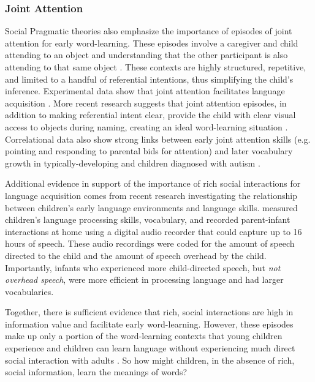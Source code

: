 \documentclass[man]{apa2}
\begin{document}
\subsubsection{Joint Attention}

Social Pragmatic theories also emphasize the importance of episodes of joint attention for early word-learning. These episodes involve a caregiver and child attending to an object and understanding that the other participant is also attending to that same object \cite{carpenter1995joint, tomasello1983joint}. These contexts are highly structured, repetitive, and limited to a handful of referential intentions, thus simplifying the child's inference. Experimental data show that joint attention facilitates language acquisition \cite{brooks2008infant,farrar1993event}. More recent research suggests that joint attention episodes, in addition to making referential intent clear, provide the child with clear visual access to objects during naming, creating an ideal word-learning situation \cite{yu2012embodied}. Correlational data also show strong links between early joint attention skills (e.g. pointing and responding to parental bids for attention) and later vocabulary growth in typically-developing \cite{tomasello1986joint, carpenter1998social,farrant2012early} and children diagnosed with autism \cite{mundy1990longitudinal}.

Additional evidence in support of the importance of rich social interactions for language acquisition comes from recent research investigating the relationship between children's early language environments and language skills.  measured children's language processing skills, vocabulary, and recorded parent-infant interactions at home using a digital audio recorder that could capture up to 16 hours of speech. These audio recordings were coded for the amount of speech directed to the child and the amount of speech overhead by the child. Importantly, infants who experienced more child-directed speech, but \emph{not overhead speech}, were more efficient in processing language and had larger vocabularies. 

Together, there is sufficient evidence that rich, social interactions are high in information value and facilitate early word-learning. However, these episodes make up only a portion of the word-learning contexts that young children experience \cite{frank2013social} and children can learn language without experiencing much direct social interaction with adults \cite{shneidman2012language}. So how might children, in the absence of rich, social information, learn the meanings of words? 
\end{document}
